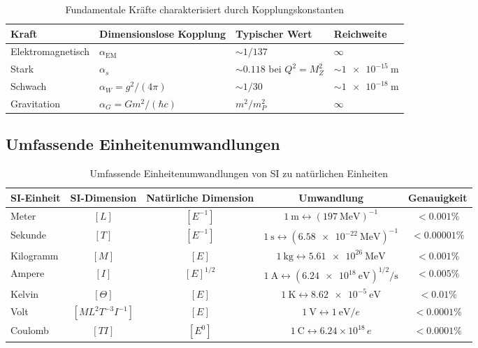 \documentclass[11pt,a4paper]{article}
\begin{document}
	\begin{table}[htbp]
		\centering
		\begin{adjustbox}{width=0.9\textwidth}
			\begin{tabular}{llll}
				\toprule
				\textbf{Kraft} & \textbf{Dimensionslose Kopplung} & \textbf{Typischer Wert} & \textbf{Reichweite} \\
				\midrule
				Elektromagnetisch & $\alpha_{\text{EM}}$ & $\sim 1/137$ & $\infty$ \\
				Stark & $\alpha_s$ & $\sim 0.118$ bei $Q^2 = M_Z^2$ & $\sim \SI{1e-15}{\meter}$ \\
				Schwach & $\alpha_W = g^2/(4\pi)$ & $\sim 1/30$ & $\sim \SI{1e-18}{\meter}$ \\
				Gravitation & $\alpha_G = G m^2/(\hbar c)$ & $m^2/m_P^2$ & $\infty$ \\
				\bottomrule
			\end{tabular}
		\end{adjustbox}
		\caption{Fundamentale Kräfte charakterisiert durch Kopplungskonstanten}
		\label{tab:kraefte}
	\end{table}
	
	\subsection{Umfassende Einheitenumwandlungen}
	
	\begin{table}[htbp]
		\centering
		\begin{adjustbox}{width=0.95\textwidth}
			\begin{tabular}{lcccc}
				\toprule
				\textbf{SI-Einheit} & \textbf{SI-Dimension} & \textbf{Natürliche Dimension} & \textbf{Umwandlung} & \textbf{Genauigkeit} \\
				\midrule
				Meter & $[L]$ & $[E^{-1}]$ & $\SI{1}{\meter} \leftrightarrow (\SI{197}{\mega\electronvolt})^{-1}$ & $< 0.001\%$ \\
				Sekunde & $[T]$ & $[E^{-1}]$ & $\SI{1}{\second} \leftrightarrow (\SI{6.58e-22}{\mega\electronvolt})^{-1}$ & $< 0.00001\%$ \\
				Kilogramm & $[M]$ & $[E]$ & $\SI{1}{\kilogram} \leftrightarrow \SI{5.61e26}{\mega\electronvolt}$ & $< 0.001\%$ \\
				Ampere & $[I]$ & $[E]^{1/2}$ & $\SI{1}{\ampere} \leftrightarrow (\SI{6.24e18}{\electronvolt})^{1/2}/\si{\second}$ & $< 0.005\%$ \\
				Kelvin & $[\Theta]$ & $[E]$ & $\SI{1}{\kelvin} \leftrightarrow \SI{8.62e-5}{\electronvolt}$ & $< 0.01\%$ \\
				Volt & $[ML^2 T^{-3} I^{-1}]$ & $[E]$ & $\SI{1}{\volt} \leftrightarrow \SI{1}{\electronvolt}/e$ & $< 0.0001\%$ \\
				Coulomb & $[T I]$ & $[E^0]$ & $\SI{1}{\coulomb} \leftrightarrow 6.24 \times 10^{18} \, e$ & $< 0.0001\%$ \\
				\bottomrule
			\end{tabular}
		\end{adjustbox}
		\caption{Umfassende Einheitenumwandlungen von SI zu natürlichen Einheiten}
		\label{tab:umwandlung}
	\end{table}
	
\end{document}
